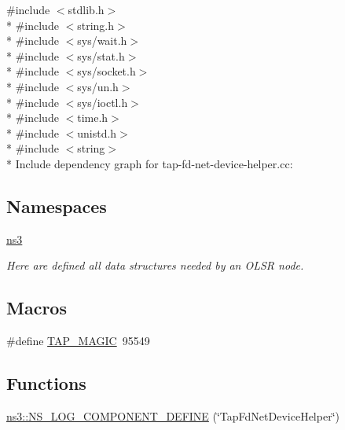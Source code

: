 {\ttfamily \#include $<$stdlib.\+h$>$}\\*
{\ttfamily \#include $<$string.\+h$>$}\\*
{\ttfamily \#include $<$sys/wait.\+h$>$}\\*
{\ttfamily \#include $<$sys/stat.\+h$>$}\\*
{\ttfamily \#include $<$sys/socket.\+h$>$}\\*
{\ttfamily \#include $<$sys/un.\+h$>$}\\*
{\ttfamily \#include $<$sys/ioctl.\+h$>$}\\*
{\ttfamily \#include $<$time.\+h$>$}\\*
{\ttfamily \#include $<$unistd.\+h$>$}\\*
{\ttfamily \#include $<$string$>$}\\*
Include dependency graph for tap-\/fd-\/net-\/device-\/helper.cc\+:
\subsection*{Namespaces}
\begin{DoxyCompactItemize}
\item 
 \hyperlink{namespacens3}{ns3}
\begin{DoxyCompactList}\small\item\em Here are defined all data structures needed by an O\+L\+SR node. \end{DoxyCompactList}\end{DoxyCompactItemize}
\subsection*{Macros}
\begin{DoxyCompactItemize}
\item 
\#define \hyperlink{tap-fd-net-device-helper_8cc_af9ac95d538205da6013d79a63fee2bd7}{T\+A\+P\+\_\+\+M\+A\+G\+IC}~95549
\end{DoxyCompactItemize}
\subsection*{Functions}
\begin{DoxyCompactItemize}
\item 
\hyperlink{namespacens3_ab984d9889578bd51d4221a437549ec9a}{ns3\+::\+N\+S\+\_\+\+L\+O\+G\+\_\+\+C\+O\+M\+P\+O\+N\+E\+N\+T\+\_\+\+D\+E\+F\+I\+NE} (\char`\"{}Tap\+Fd\+Net\+Device\+Helper\char`\"{})
\end{DoxyCompactItemize}


